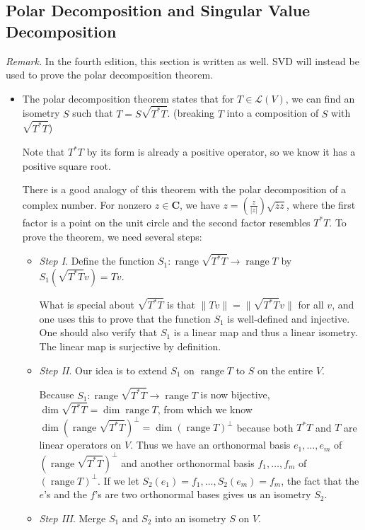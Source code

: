 \documentclass{article}
\newcommand{\C}{\mathbf{C}}
\renewcommand{\r}{\operatorname{range}}
\renewcommand{\d}{\dim}
\newcommand{\conj}[1]{\overline{#1}}
\newcommand{\nm}[1]{\| #1 \|}
\newcommand{\LV}{\mathcal{L}(V)}
\begin{document}
\subsection{Polar Decomposition and Singular Value Decomposition}
\textit{Remark.} In the fourth edition, this section is written as well. SVD will instead be used to prove the polar decomposition theorem.
\begin{itemize}
\item The polar decomposition theorem states that for $T \in \LV$, we can find an isometry $S$ such that $T = S \sqrt{T^*T}$. (breaking $T$ into a composition of $S$ with $\sqrt{T^*T}$)

Note that $T^*T$ by its form is already a positive operator, so we know it has a positive square root.

There is a good analogy of this theorem with the polar decomposition of a complex number. For nonzero $z \in \C$, we have $z = \left(\frac{z}{|z|}\right)\sqrt{\conj{z}z}$, where the first factor is a point on the unit circle and the second factor resembles $T^*T$. To prove the theorem, we need several steps:
\begin{itemize}
    \item \textit{Step I}. Define the function $S_1: \r \sqrt{T^*T} \to \r T$ by $S_1(\sqrt{T^*T}v)=Tv$.
    
    What is special about $\sqrt{T^*T}$ is that $\nm{Tv}=\nm{\sqrt{T^*T}v}$ for all $v$, and one uses this to prove that the function $S_1$ is well-defined and injective. One should also verify that $S_1$ is a linear map and thus a linear isometry. The linear map is surjective by definition.
    
    \item \textit{Step II}. Our idea is to extend $S_1$ on $\r T$ to $S$ on the entire $V$. 
    
    Because $S_1: \r \sqrt{T^*T} \to \r T$ is now bijective, $\d \sqrt{T^*T} = \d \r T$, from which we know $\d(\r \sqrt{T^*T})^\perp = \d(\r T)^\perp$ because both $T^*T$ and $T$ are linear operators on $V$. Thus we have an orthonormal basis $e_1,\dots,e_m$ of $(\r \sqrt{T^*T})^\perp$ and another orthonormal basis $f_1,\dots,f_m$ of $(\r T)^\perp$. If we let $S_2(e_1) = f_1,\dots,S_2(e_m)=f_m$, the fact that the $e$'s and the $f$'s are two orthonormal bases gives us an isometry $S_2$.
    
    \item \textit{Step III}. Merge $S_1$ and $S_2$ into an isometry $S$ on $V$.
    

\end{itemize}
\end{itemize}
\end{document}
